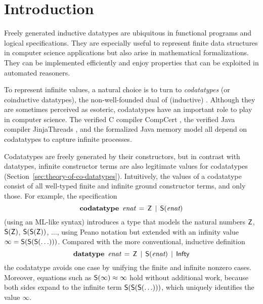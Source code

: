 \setcounter{footnote}{0}

\section{Introduction}
\label{sec:introduction}

Freely generated inductive datatypes are ubiquitous in functional programs and
logical specifications. They are especially
useful to represent finite data structures in computer science applications but
also arise in mathematical formalizations.
They can be implemented efficiently and enjoy
properties that can be exploited in automated reasoners. 
%

To represent infinite values, %
a natural choice is to turn to \emph{codatatypes} (or coinductive datatypes), the
non-well-founded dual of (inductive) .
%
Although they are sometimes perceived as esoteric, codatatypes have an important
role to play in computer science. The verified C compiler CompCert
\cite{leroy-2009}, the verified Java compiler Jinja\-Threads
\cite{lochbihler-2010-jinja}, and the formalized Java memory model
\cite{lochbihler-2014-jmm} all depend on codatatypes to capture infinite
processes.

Codatatypes are freely generated by their constructors, but in contrast with datatypes,
infinit\-e constructor terms are also legitimate values for codatatypes
(Section~\ref{sec:theory-of-co-datatypes}). Intuitively, the
values of a codatatype consist of all well-typed finite and infinite ground constructor
terms, and only those. For example, the specification
%
\[\textbf{codatatype}~\,\textit{enat} \,=\, \textsf{Z} \,\mid\, \textsf{S}(\textit{enat})\]
%
(using an ML-like syntax) introduces a type that
models the natural numbers $\textsf{Z}$, $\textsf{S}(\textsf{Z})$, $\textsf{S}(\textsf{S}(\textsf{Z}))$, $\ldots$\afterLdots{},
using Peano notation but extended with an
infinity value $\infty = \textsf{S}(\textsf{S}(\textsf{S}(\ldots)))$. Compared
with the more conventional, inductive definition
\[\textbf{datatype}~\,\textit{enat} \,=\, \textsf{Z} \,\mid\, \textsf{S}(\textit{enat}) \,\mid\, \textsf{Infty}\]
%
the codatatype avoids one case by unifying the finite and infinite nonzero cases.
Moreover, equations such as $\textsf{S}(\infty) \approx \infty$ hold without additional
work, because both sides expand to the infinite term
$\textsf{S}(\textsf{S}(\textsf{S}(\ldots)))$, which uniquely identifies the
value $\infty$.

